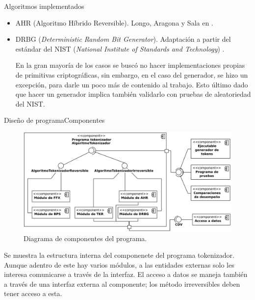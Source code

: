 \begin{frame}{Algoritmos implementados}
\begin{itemize}
\begin{itemize}
        \item<6-> AHR (Algoritmo Híbrido Reversible). Longo, Aragona y Sala
          en \cite{aragona}.

        \item<7-> DRBG (\textit{Deterministic Random Bit Generator}). Adaptación
          a partir del estándar del NIST (\textit{National Institute of Standards
          and Technology}) \cite{nist_aleatorios}.

          {
            En la gran mayoría de los casos se buscó no hacer implementaciones
            propias de primitivas criptográficas, sin embargo, en el caso del
            generador, se hizo un excepción, para darle un poco más de contenido
            al trabajo. Esto último dado que hacer un generador implica también
            validarlo con pruebas de aleatoriedad del NIST.
          }

      \end{itemize}
  \end{itemize}
\end{frame}

\begin{frame}{Diseño de programa}{Componentes}

  \begin{figure}[H]
    \begin{center}
      \includegraphics[width=1.0\linewidth]
        {../../../diagramas_comunes/disenio/componentes_v2.png}
      \caption{Diagrama de componentes del programa.}
    \end{center}
  \end{figure}

  \note
  {
    Se muestra la estructura interna del componenete del programa
    tokenizador. Aunque adentro de este hay varios módulos, a las entidades
    externas solo les interesa comunicarse a través de la interfaz. El acceso
    a datos se maneja también a través de una interfaz externa al componente;
    los método irreversibles deben tener acceso a esta.
  }

\end{frame}
